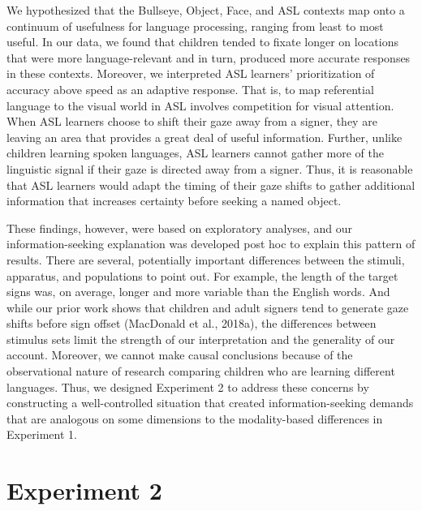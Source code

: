 \documentclass[,man,floatsintext]{apa6}
\begin{document}
We hypothesized that the Bullseye, Object, Face, and ASL contexts map onto a continuum of usefulness for language processing, ranging from least to most useful. In our data, we found that children tended to fixate longer on locations that were more language-relevant and in turn, produced more accurate responses in these contexts. Moreover, we interpreted ASL learners' prioritization of accuracy above speed as an adaptive response. That is, to map referential language to the visual world in ASL involves competition for visual attention. When ASL learners choose to shift their gaze away from a signer, they are leaving an area that provides a great deal of useful information. Further, unlike children learning spoken languages, ASL learners cannot gather more of the linguistic signal if their gaze is directed away from a signer. Thus, it is reasonable that ASL learners would adapt the timing of their gaze shifts to gather additional information that increases certainty before seeking a named object.

These findings, however, were based on exploratory analyses, and our information-seeking explanation was developed post hoc to explain this pattern of results. There are several, potentially important differences between the stimuli, apparatus, and populations to point out. For example, the length of the target signs was, on average, longer and more variable than the English words. And while our prior work shows that children and adult signers tend to generate gaze shifts before sign offset (MacDonald et al., 2018a), the differences between stimulus sets limit the strength of our interpretation and the generality of our account. Moreover, we cannot make causal conclusions because of the observational nature of research comparing children who are learning different languages. Thus, we designed Experiment 2 to address these concerns by constructing a well-controlled situation that created information-seeking demands that are analogous on some dimensions to the modality-based differences in Experiment 1.

\hypertarget{experiment-2}{%
\section{Experiment 2}\label{experiment-2}}
\end{document}
